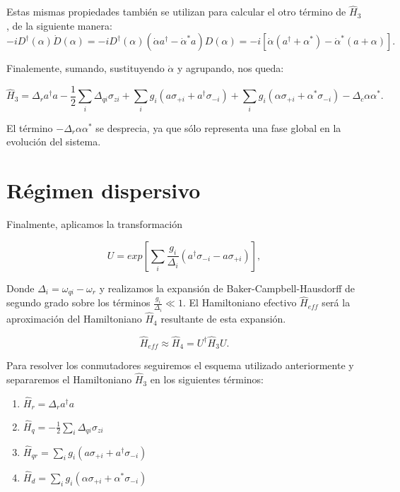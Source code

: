 Estas mismas propiedades también se utilizan para calcular el otro término de $\hat{H}_3$, de la siguiente manera:
\begin{equation}
    -i D^\dagger(\alpha) \dot{D}(\alpha) = -i D^\dagger(\alpha) (\dot{\alpha} a^\dagger - \dot{\alpha}^* a) D(\alpha) = -i[\dot{\alpha} (a^\dagger + \alpha^*) - \dot{\alpha}^* (a + \alpha)] .
\end{equation}

Finalemente, sumando, sustituyendo $\dot{\alpha}$ y agrupando, nos queda:

\begin{equation}
    \hat{H}_3 = \Delta_r a^\dagger a - \frac{1}{2} \sum\limits_i \Delta_{qi} \sigma_{zi} + \sum\limits_i g_i (a \sigma_{+i} + a^\dagger \sigma_{-i}) + \sum\limits_i g_i (\alpha \sigma_{+i} + \alpha^* \sigma_{-i}) - \Delta_c \alpha \alpha^* .
\end{equation}

El término $-\Delta_r \alpha \alpha^*$ se desprecia, ya que sólo representa una fase global en la evolución del sistema.

\section{Régimen dispersivo}

Finalmente, aplicamos la transformación

\begin{equation}
    U = exp[\sum\limits_i \frac{g_i} {\Delta_i} (a^\dagger \sigma_{-i} - a \sigma_{+i})] ,
\end{equation}

Donde $\Delta_i = \omega_{qi} - \omega_r$ y realizamos la expansión de Baker-Campbell-Hausdorff de segundo grado sobre los términos $\frac{g_i}{\Delta_i} \ll 1$. El Hamiltoniano efectivo $\hat{H}_{eff}$ será la aproximación del Hamiltoniano $\hat{H}_4$ resultante de esta expansión.

\begin{equation}
    \hat{H}_{eff} \approx \hat{H}_4 = U^\dagger \hat{H}_3 U .
\end{equation}

Para resolver los conmutadores seguiremos el esquema utilizado anteriormente y separaremos el Hamiltoniano $\hat{H}_3$ en los siguientes términos:

\begin{enumerate}
    \item $\hat{H}_r = \Delta_r a^\dagger a$
    \item $\hat{H}_q = - \frac{1}{2} \sum\limits_i \Delta_{qi} \sigma_{zi}$
    \item $\hat{H}_{qr} = \sum\limits_i g_i (a \sigma_{+i} + a^\dagger \sigma_{-i})$
    \item $\hat{H}_d = \sum\limits_i g_i (\alpha \sigma_{+i} + \alpha^* \sigma_{-i})$
\end{enumerate}

